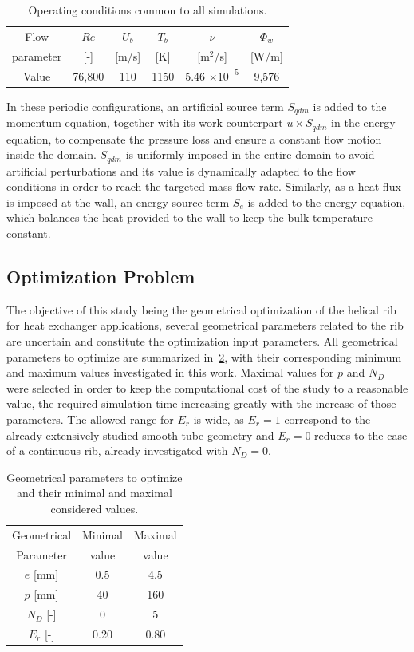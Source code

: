 \begin{table}
\small
\centering
\begin{tabular}{c|c|c|c|c|c}
  Flow & $Re$ & $U_b$ & $T_b$ & $\nu$ & $\Phi_w$    \\
  parameter & [-]  & [m/s] & [K]   & [m$^2$/s] & [W/m] \\
  \hline
  Value & 76,800 & 110 & 1150 & 5.46 $\times 10^{-5}$ & 9,576 \\
\end{tabular}
\caption{Operating conditions common to all simulations.}
\label{tab_opconditions}
\end{table}

In these periodic configurations, an artificial source term $S_{qdm}$ is added to the momentum equation, together with its work counterpart $u \times S_{qdm}$ in the energy equation, to compensate the pressure loss and ensure a constant flow motion inside the domain. $S_{qdm}$ is uniformly imposed in the entire domain to avoid artificial perturbations and its value is dynamically adapted to the flow conditions in order to reach the targeted mass flow rate. Similarly, as a heat flux is imposed at the wall, an energy source term $S_e$ is added to the energy equation, which balances the heat provided to the wall to keep the bulk temperature constant.

\subsection{Optimization Problem}

The objective of this study being the geometrical optimization of the helical rib for heat exchanger applications, several geometrical parameters related to the rib are uncertain and constitute the optimization input parameters. All geometrical parameters to optimize are summarized in~\cref{tab_parameters}, with their corresponding minimum and maximum values investigated in this work. Maximal values for $p$ and $N_D$ were selected in order to keep the computational cost of the study to a reasonable value, the required simulation time increasing greatly with the increase of those parameters. The allowed range for $E_r$ is wide, as $E_r = 1$ correspond to the already extensively studied smooth tube geometry and $E_r = 0$ reduces to the case of a continuous rib, already investigated with $N_D = 0$.

\begin{table}
\small
\centering
\begin{tabular}{c|c|c}
  Geometrical & Minimal & Maximal \\
  Parameter & value & value \\
  \hline
  $e$ [mm] & 0.5 & 4.5 \\
  $p$ [mm] & 40 & 160 \\
  $N_D$ [-] & 0 & 5 \\
  $E_r$ [-] & 0.20 & 0.80 \\
\end{tabular}
\caption{Geometrical parameters to optimize and their minimal and maximal considered values.}
\label{tab_parameters}
\end{table}

